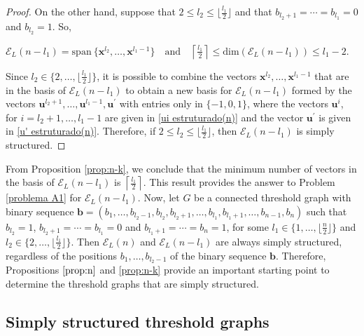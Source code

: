 \documentclass[preprint]{elsarticle}
\begin{document}
\begin{proof}
On the other hand, suppose that $2\leq l_2 \leq \lfloor \frac{l_1}{2} \rfloor$ and that $b_{l_2+1}=\cdots=b_{l_1}=0$ and $b_{l_2}=1$. So,
\begin{center}
$\mathcal{E}_L(n-l_1)=\mathrm{span} \ \{ \mathbf{x}^{l_2}, \ldots, \mathbf{x}^{l_1-1} \} \quad  \textrm{and} \quad \left\lceil \frac{l_1}{2} \right\rceil \leq \mathrm{dim}(\mathcal{E}_{L}(n-l_1)) \leq l_1-2.$
\end{center} 
Since $l_2 \in \{2,\ldots, \lfloor \frac{l_1}{2} \rfloor\}$, it is possible to combine the vectors $\mathbf{x}^{l_2}, \ldots, \mathbf{x}^{l_1-1}$ that are in the basis of $\mathcal{E}_L(n-l_1)$ to obtain a new basis for $\mathcal{E}_L(n-l_1)$ formed by the vectors $\mathbf{u}^{l_2+1}, \ldots, \mathbf{u}^{l_1-1},\mathbf{u}^{\prime}$ with entries only in $\{-1,0,1\}$, where the vectors $\mathbf{u}^{i}$, for $i=l_2+1, \ldots, l_1-1$ are given in \eqref{ui estruturado(n)} and the vector $\mathbf{u}^{\prime}$ is given in \eqref{u' estruturado(n)}. Therefore, if $2\leq l_2 \leq \lfloor \frac{l_1}{2} \rfloor$, then $\mathcal{E}_L(n-l_1)$ is simply structured.
\end{proof} 

From Proposition \ref{prop:n-k}, we conclude that the minimum number of vectors in the basis of $\mathcal{E}_{L}(n-l_1)$ is $\left\lceil\frac{l_1}{2}\right\rceil$. This result provides the answer to Problem \ref{problema A1} for $\mathcal{E}_{L}(n-l_1).$ Now, let $G$ be a connected threshold graph with binary sequence \break 
$\mathbf{b}=(b_1, \ldots, b_{l_2-1}, b_{l_2}, b_{l_2+1}, \ldots, b_{l_1}, b_{l_1+1}, \ldots, b_{n-1}, b_n)$ 
such that $b_{l_2}=1$, \break $b_{l_2+1}=\cdots=b_{l_1}=0$ and $b_{l_1+1}=\cdots=b_{n}=1$, for some $l_1\in \{1,\ldots, \lfloor\frac{n}{2}\rfloor\}$ and $l_2\in \{2,\ldots, \lfloor\frac{l_1}{2}\rfloor\}$. Then $\mathcal{E}_L(n)$ and $\mathcal{E}_L(n-l_1)$ are always  simply structured, regardless of the positions $b_{1}, \ldots, b_{l_2-1}$ of the binary sequence $\mathbf{b}$. Therefore, Propositions $\ref{prop:n}$ and \ref{prop:n-k} provide an important starting point to determine the threshold graphs that are simply structured. 


\subsection{Simply structured threshold graphs}\label{section SS}
\end{document}

